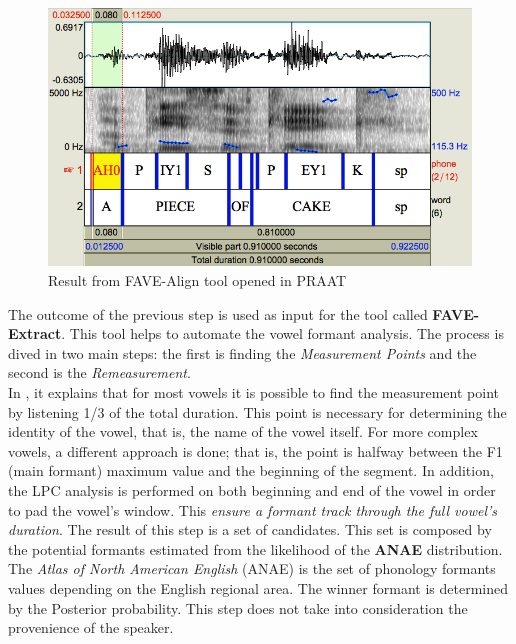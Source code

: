 \begin{figure}[!ht]
	\centering
	\includegraphics[scale=0.4]{Figures/fave_align.png}
	\caption{Result from FAVE-Align tool opened in PRAAT}
	\label{fig:fave-align_result}
\end{figure}

\noindent The outcome of the previous step is used as input for the tool called \textbf{FAVE-Extract}. This tool helps to automate the vowel formant analysis. The process is dived in two main steps: the first is finding the \textit{Measurement Points} and the second is the \textit{Remeasurement}. \\

\noindent In \cite{rosenfelder2011fave}, it explains that for most vowels it is possible to find the measurement point by listening 1/3 of the total duration. This point is necessary for determining the identity of the vowel, that is, the name of the vowel itself. For more complex vowels, a different approach is done; that is, the point is halfway between the F1 (main formant) maximum value and the beginning of the segment. In addition, the LPC analysis is performed on both beginning and end of the vowel in order to pad the vowel's window. This \emph{ensure a formant track through the full vowel's duration}\cite{harrison2004variability}. The result of this step is a set of candidates. This set is composed by the potential formants estimated from the likelihood of the \textbf{ANAE} distribution. The \textit{Atlas of North American English} (ANAE) is the set of phonology formants values depending on the English regional area. The winner formant is determined by the Posterior probability. This step does not take into consideration the provenience of the speaker. \\

